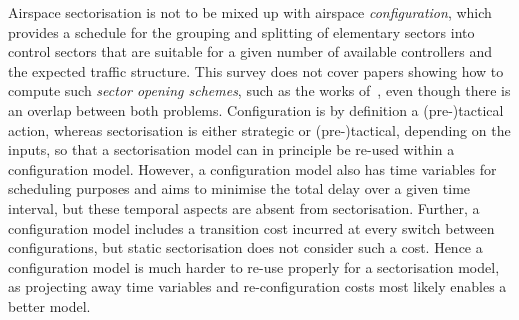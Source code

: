 \documentclass[a4paper,12pt]{article}
\begin{document}
Airspace sectorisation is not to be mixed up with airspace
\emph{configuration}, which provides a schedule for the grouping and
splitting of elementary sectors into control sectors that are suitable
for a given number of available controllers and the expected traffic
structure.  This survey does not cover papers showing how to compute
such \emph{sector opening schemes}, such as the works
of~\cite{Barbosa:CASPT01,Verlhac:EEC05}, even though there is an
overlap between both problems.  Configuration is by definition a
(pre-)tactical action, whereas sectorisation is either strategic or
(pre-)tactical, depending on the inputs, so that a sectorisation model
can in principle be re-used within a configuration model.  However, a
configuration model also has time variables for scheduling purposes
and aims to minimise the total delay over a given time interval, but
these temporal aspects are absent from sectorisation.  Further, a
configuration model includes a transition cost incurred at every
switch between configurations, but static sectorisation does not
consider such a cost.  Hence a configuration model is much harder to
re-use properly for a sectorisation model, as projecting away time
variables and re-configuration costs most likely enables a better
model.
\end{document}
